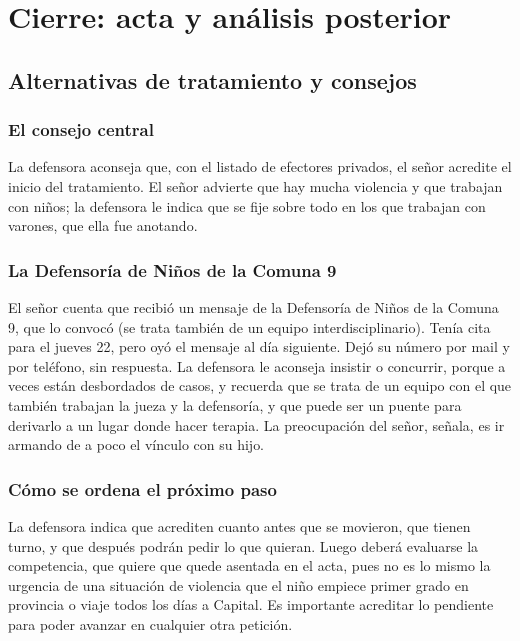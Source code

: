 \documentclass[12pt,oneside]{book}
\begin{document}
\chapter[Cierre: acta y an\'alisis]{Cierre: acta y an\'alisis posterior}

\section{Alternativas de tratamiento y consejos}

\subsection{El consejo central}

La defensora aconseja que, con el listado de efectores privados, el se\~nor acredite el inicio del tratamiento. El se\~nor advierte que hay mucha violencia y que trabajan con ni\~nos; la defensora le indica que se fije sobre todo en los que trabajan con varones, que ella fue anotando.

\subsection{La Defensor\'ia de Ni\~nos de la Comuna 9}

El se\~nor cuenta que recibi\'o un mensaje de la Defensor\'ia de Ni\~nos de la Comuna 9, que lo convoc\'o (se trata tambi\'en de un equipo interdisciplinario). Ten\'ia cita para el jueves 22, pero oy\'o el mensaje al d\'ia siguiente. Dej\'o su n\'umero por mail y por tel\'efono, sin respuesta. La defensora le aconseja insistir o concurrir, porque a veces est\'an desbordados de casos, y recuerda que se trata de un equipo con el que tambi\'en trabajan la jueza y la defensor\'ia, y que puede ser un puente para derivarlo a un lugar donde hacer terapia. La preocupaci\'on del se\~nor, se\~nala, es ir armando de a poco el v\'inculo con su hijo.

\subsection{C\'omo se ordena el pr\'oximo paso}

La defensora indica que acrediten cuanto antes que se movieron, que tienen turno, y que despu\'es podr\'an pedir lo que quieran. Luego deber\'a evaluarse la competencia, que quiere que quede asentada en el acta, pues no es lo mismo la urgencia de una situaci\'on de violencia que el ni\~no empiece primer grado en provincia o viaje todos los d\'ias a Capital. Es importante acreditar lo pendiente para poder avanzar en cualquier otra petici\'on.
\end{document}
